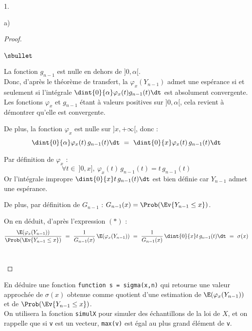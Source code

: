 \documentclass[11pt]{article}%
\begin{document}
\begin{noliste}{1.}
\begin{noliste}{a)}
    \begin{proof}~
      \begin{noliste}{$\sbullet$}
	\item La fonction $g_{n-1}$ est nulle en dehors de $]0,
	\alpha[$.\\
	Donc, d'après le théorème de transfert, la \var $\varphi_x(
	Y_{n-1})$ admet une espérance si et seulement si l'intégrale
	$\dint{0}{\alpha} \varphi_x(t) g_{n-1}(t) \dt$ est 
	absolument convergente.\\[.1cm]
	Les fonctions $\varphi_x$ et $g_{n-1}$ étant à valeurs 
	positives sur $]0,\alpha[$, cela revient à démontrer qu'elle 
	est convergente.
	
	\item De plus, la fonction $\varphi_x$ est nulle sur $]x,
	+\infty[$, donc :
	\[
	  \dint{0}{\alpha} \varphi_x(t) \, g_{n-1}(t) \dt \ = \
	  \dint{0}{x} \varphi_x(t) \, g_{n-1}(t) \dt
	\]
	
	\item Par définition de $\varphi_x$ :
	\[
	  \forall t \in \ ]0,x], \ \varphi_x(t) \, g_{n-1}(t)
	  = t \, g_{n-1}(t)
	\]
	Or l'intégrale impropre $\dint{0}{x} t \,
	g_{n-1}(t) \dt$ est bien définie car $Y_{n-1}$ admet une 
	espérance.
	
	\item De plus, par définition de $G_{n-1}$ :
	$G_{n-1}(x) = \Prob(\Ev{Y_{n-1} \leq x})$.
	
	\item On en déduit, d'après l'expression $(*)$ :
	\[
	  \dfrac{\E(\varphi_x(Y_{n-1}))}{\Prob(\Ev{Y_{n-1} \leq x})}
	  \ = \ \dfrac{1}{G_{n-1}(x)} \, \E(\varphi_x(Y_{n-1}))
	  \ = \ \dfrac{1}{G_{n-1}(x)} \, \dint{0}{x} t \, 
	  g_{n-1}(t) \dt \ = \ \sigma(x)
	\]
	~\\[-1.4cm]
      \end{noliste}
    \end{proof}
    
    
    \newpage

    
    \item En déduire une fonction \Scilab{} {\tt function s = 
    sigma(x,n)} qui retourne une valeur approchée de $\sigma(x)$
    obtenue comme quotient d'une estimation de $\E(\varphi_x(Y_{n-1}))$
    et de $\Prob(\Ev{Y_{n-1} \leq x})$.\\
    On utilisera la fonction {\tt simulX} pour simuler des 
    échantillons de la loi de $X$, et on rappelle que si {\tt v} est 
    un vecteur, {\tt max(v)} est égal au plus grand élément de 
    {\tt v}.
    

\end{noliste}
\end{noliste}
\end{document}
